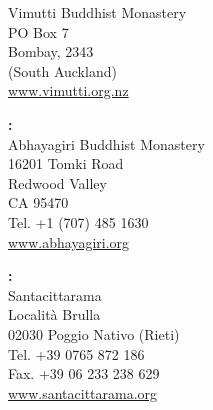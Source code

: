 {\begin{minipage}{0.8\linewidth}
\begin{multicols}{2}
{Vimutti Buddhist Monastery\\
PO Box 7\\
Bombay, 2343\\
(South Auckland)\\
\href{http://www.vimutti.org.nz}{www.vimutti.org.nz}

\vfill

\textbf{\MakeUppercase{\textUnitedStates}:} \\
Abhayagiri Buddhist Monastery\\
16201 Tomki Road\\
Redwood Valley\\
CA 95470\\
Tel. +1 (707) 485 1630\\
\href{http://www.abhayagiri.org}{www.abhayagiri.org}

\vfill

\textbf{\MakeUppercase{\textItaly}:} \\
Santacittarama\\
Località Brulla\\
02030 Poggio Nativo (Rieti)\\
Tel. +39 0765 872 186\\
Fax. +39 06 233 238 629\\
\href{http://www.santacittarama.org}{www.santacittarama.org}


}

\end{multicols}
\end{minipage}

}
